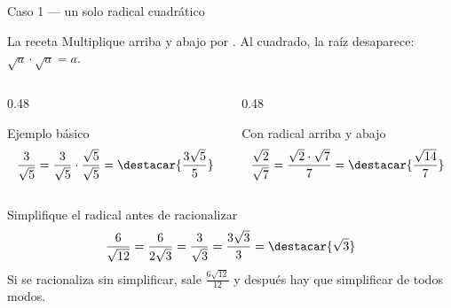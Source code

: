 \documentclass[aspectratio=169,10pt]{beamer}
\begin{document}
\begin{frame}{Caso 1 — un solo radical cuadrático}
  \scriptsize
  \begin{block}{La receta}
    \tiny
    Multiplique arriba y abajo por . Al cuadrado,
    la raíz desaparece: $\sqrt{a}\cdot\sqrt{a} = a$.
  \end{block}

  \vspace{0.1cm}
  \begin{columns}[T,onlytextwidth]
    \begin{column}{0.48\textwidth}
      \begin{exampleblock}{Ejemplo básico}
        \tiny
        \[ \frac{3}{\sqrt{5}}
           = \frac{3}{\sqrt{5}}\cdot\frac{\sqrt{5}}{\sqrt{5}}
           = \destacar{\frac{3\sqrt{5}}{5}} \]
      \end{exampleblock}
    \end{column}
    \begin{column}{0.48\textwidth}
      \begin{exampleblock}{Con radical arriba y abajo}
        \tiny
        \[ \frac{\sqrt{2}}{\sqrt{7}}
           = \frac{\sqrt{2}\cdot\sqrt{7}}{7}
           = \destacar{\frac{\sqrt{14}}{7}} \]
      \end{exampleblock}
    \end{column}
  \end{columns}

  \vspace{0.12cm}
  \begin{alertblock}{Simplifique el radical antes de racionalizar}
    \tiny
    \[ \frac{6}{\sqrt{12}} = \frac{6}{2\sqrt{3}} = \frac{3}{\sqrt{3}}
       = \frac{3\sqrt{3}}{3} = \destacar{\sqrt{3}} \]
    Si se racionaliza sin simplificar, sale $\tfrac{6\sqrt{12}}{12}$ y
    después hay que simplificar de todos modos. 
  \end{alertblock}
\end{frame}
\end{document}
